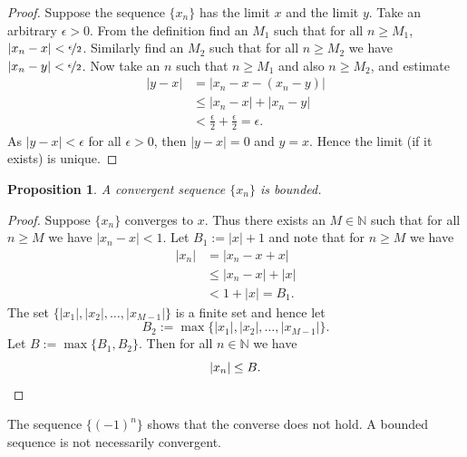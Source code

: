 \documentclass[12pt]{book}
\newcommand{\abs}[1]{\left\lvert {#1} \right\rvert}
\newcommand{\N}{{\mathbb{N}}}
\theoremstyle{plain}
\newtheorem{prop}[thm]{Proposition}
\theoremstyle{remark}
\theoremstyle{definition}
\theoremstyle{exercise}
\theoremstyle{example}
\begin{document}
\begin{proof}
Suppose the sequence $\{ x_n \}$ has the limit $x$ and the limit $y$.
Take an arbitrary $\epsilon > 0$.
From the definition find an $M_1$ such that for all $n \geq M_1$,
$\abs{x_n-x} < \nicefrac{\epsilon}{2}$.  Similarly find an $M_2$
such that for all $n \geq M_2$ we have
$\abs{x_n-y} < \nicefrac{\epsilon}{2}$.
Now take an $n$ such that $n \geq M_1$ and also $n \geq M_2$, and estimate
\begin{equation*}
\begin{split}
\abs{y-x}
& =
\abs{x_n-x - (x_n -y)} \\
& \leq
\abs{x_n-x} + \abs{x_n -y} \\
& <
\frac{\epsilon}{2} + \frac{\epsilon}{2} = \epsilon .
\end{split}
\end{equation*}
As $\abs{y-x} < \epsilon$ for all $\epsilon > 0$, then $\abs{y-x} = 0$
and $y=x$.  Hence the limit (if it exists) is unique.
\end{proof}

\begin{prop}
A convergent sequence $\{ x_n \}$ is bounded.
\end{prop}

\begin{proof}
Suppose $\{ x_n \}$ converges to $x$.  Thus there exists an $M \in \N$
such that for all $n \geq M$ we have
$\abs{x_n - x} < 1$.  Let $B_1 := \abs{x}+1$ and note that for $n \geq M$ we
have
\begin{equation*}
\begin{split}
\abs{x_n} & = \abs{x_n - x + x}
\\
& \leq \abs{x_n - x} + \abs{x}
\\
& < 1 + \abs{x} = B_1 .
\end{split}
\end{equation*}
The set $\{ \abs{x_1}, \abs{x_2}, \ldots, \abs{x_{M-1}} \}$
is a finite set and hence let
\begin{equation*}
B_2 := \max \{ \abs{x_1}, \abs{x_2}, \ldots, \abs{x_{M-1}} \} .
\end{equation*}
Let $B := \max \{ B_1, B_2 \}$.  Then for all $n \in \N$ we have
\begin{equation*}
\abs{x_n} \leq B. \qedhere
\end{equation*}
\end{proof}

The sequence $\{ {(-1)}^n \}$ shows that the converse
does not hold.  A bounded sequence is not necessarily convergent.
\end{document}
